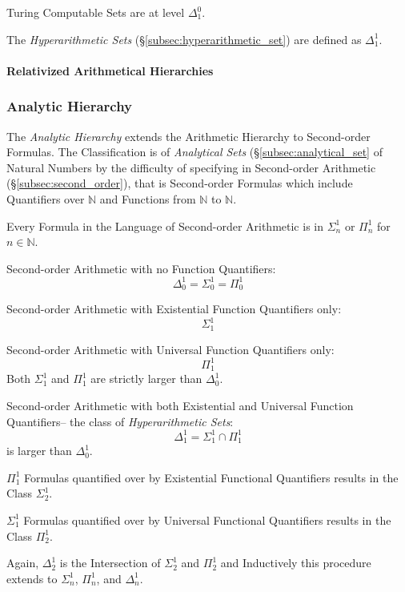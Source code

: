 \documentclass{article}
\begin{document}
Turing Computable Sets are at level $\Delta^0_1$.

The \emph{Hyperarithmetic Sets} (\S\ref{subsec:hyperarithmetic_set})
are defined as $\Delta^1_1$.

\paragraph{Relativized Arithmetical Hierarchies}



\subsubsection{Analytic Hierarchy}\label{subsec:analytic_hierarchy}

The \emph{Analytic Hierarchy} extends the Arithmetic Hierarchy to
Second-order Formulas. The Classification is of \emph{Analytical Sets}
(\S\ref{subsec:analytical_set} of Natural Numbers by the difficulty of
specifying in Second-order Arithmetic (\S\ref{subsec:second_order}),
that is Second-order Formulas which include Quantifiers over
$\mathbb{N}$ and Functions from $\mathbb{N}$ to $\mathbb{N}$.

Every Formula in the Language of Second-order Arithmetic is in
$\Sigma^1_n$ or $\Pi^1_n$ for $n \in \mathbb{N}$.

Second-order Arithmetic with no Function Quantifiers:
\[
    \Delta^1_0 = \Sigma^1_0 = \Pi^1_0
\]

Second-order Arithmetic with Existential Function Quantifiers only:
\[
    \Sigma^1_1
\]

Second-order Arithmetic with Universal Function Quantifiers only:
\[
    \Pi^1_1
\]
Both $\Sigma^1_1$ and $\Pi^1_1$ are strictly larger than $\Delta^1_0$.

Second-order Arithmetic with both Existential and Universal Function
Quantifiers-- the class of \emph{Hyperarithmetic Sets}:
\[
    \Delta^1_1 = \Sigma^1_1 \cap \Pi^1_1
\]
is larger than $\Delta^1_0$.

$\Pi^1_1$ Formulas quantified over by Existential Functional
Quantifiers results in the Class $\Sigma^1_2$.

$\Sigma^1_1$ Formulas quantified over by Universal Functional
Quantifiers results in the Class $\Pi^1_2$.

Again, $\Delta^1_2$ is the Intersection of $\Sigma^1_2$ and $\Pi^1_2$
and Inductively this procedure extends to $\Sigma^1_n$, $\Pi^1_n$, and
$\Delta^1_n$.
\end{document}
